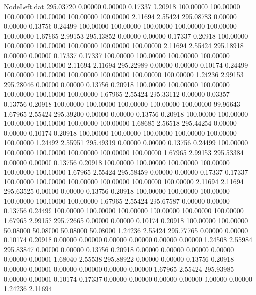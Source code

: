 \begin{filecontents}{NodeLeft.dat}
 295.03720    0.00000    0.00000     0.17337    0.20918  100.00000  100.00000  100.00000  100.00000  100.00000  100.00000    2.11694    2.55424
 295.08783    0.00000    0.00000     0.13756    0.24499  100.00000  100.00000  100.00000  100.00000  100.00000  100.00000    1.67965    2.99153
 295.13852    0.00000    0.00000     0.17337    0.20918  100.00000  100.00000  100.00000  100.00000  100.00000  100.00000    2.11694    2.55424
 295.18918    0.00000    0.00000     0.17337    0.17337  100.00000  100.00000  100.00000  100.00000  100.00000  100.00000    2.11694    2.11694
 295.22989    0.00000    0.00000     0.10174    0.24499  100.00000  100.00000  100.00000  100.00000  100.00000  100.00000    1.24236    2.99153
 295.28046    0.00000    0.00000     0.13756    0.20918  100.00000  100.00000  100.00000  100.00000  100.00000  100.00000    1.67965    2.55424
 295.33112    0.00000    0.03357     0.13756    0.20918  100.00000  100.00000  100.00000  100.00000  100.00000   99.96643    1.67965    2.55424
 295.39200    0.00000    0.00000     0.13756    0.20918  100.00000  100.00000  100.00000  100.00000  100.00000  100.00000    1.68685    2.56518
 295.44254    0.00000    0.00000     0.10174    0.20918  100.00000  100.00000  100.00000  100.00000  100.00000  100.00000    1.24492    2.55951
 295.49319    0.00000    0.00000     0.13756    0.24499  100.00000  100.00000  100.00000  100.00000  100.00000  100.00000    1.67965    2.99153
 295.53384    0.00000    0.00000     0.13756    0.20918  100.00000  100.00000  100.00000  100.00000  100.00000  100.00000    1.67965    2.55424
 295.58459    0.00000    0.00000     0.17337    0.17337  100.00000  100.00000  100.00000  100.00000  100.00000  100.00000    2.11694    2.11694
 295.63525    0.00000    0.00000     0.13756    0.20918  100.00000  100.00000  100.00000  100.00000  100.00000  100.00000    1.67965    2.55424
 295.67587    0.00000    0.00000     0.13756    0.24499  100.00000  100.00000  100.00000  100.00000  100.00000  100.00000    1.67965    2.99153
 295.72665    0.00000    0.00000     0.10174    0.20918  100.00000  100.00000   50.08000   50.08000   50.08000   50.08000    1.24236    2.55424
 295.77765    0.00000    0.00000     0.10174    0.20918    0.00000    0.00000    0.00000    0.00000    0.00000    0.00000    1.24508    2.55984
 295.83847    0.00000    0.00000     0.13756    0.20918    0.00000    0.00000    0.00000    0.00000    0.00000    0.00000    1.68040    2.55538
 295.88922    0.00000    0.00000     0.13756    0.20918    0.00000    0.00000    0.00000    0.00000    0.00000    0.00000    1.67965    2.55424
 295.93985    0.00000    0.00000     0.10174    0.17337    0.00000    0.00000    0.00000    0.00000    0.00000    0.00000    1.24236    2.11694

\end{filecontents}
